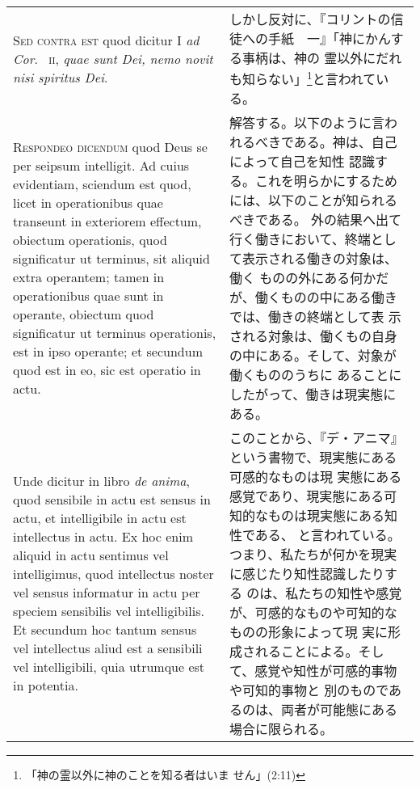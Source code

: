\documentclass[10pt]{jsarticle} %
\begin{document}
\begin{longtable}{p{21em}p{21em}}
\\


{\scshape Sed contra est} quod dicitur I {\itshape ad Cor}.~{\scshape
ii}, {\itshape quae sunt Dei, nemo novit nisi spiritus Dei}.

&

しかし反対に、『コリントの信徒への手紙　一』「神にかんする事柄は、神の
霊以外にだれも知らない」\footnote{「神の霊以外に神のことを知る者はいま
せん」(2:11)}と言われている。

\\

{\scshape Respondeo dicendum} quod Deus se per seipsum intelligit. Ad
cuius evidentiam, sciendum est quod, licet in operationibus quae
transeunt in exteriorem effectum, obiectum operationis, quod
significatur ut terminus, sit aliquid extra operantem; tamen in
operationibus quae sunt in operante, obiectum quod significatur ut
terminus operationis, est in ipso operante; et secundum quod est in
eo, sic est operatio in actu.

&

解答する。以下のように言われるべきである。神は、自己によって自己を知性
認識する。これを明らかにするためには、以下のことが知られるべきである。
外の結果へ出て行く働きにおいて、終端として表示される働きの対象は、働く
ものの外にある何かだが、働くものの中にある働きでは、働きの終端として表
示される対象は、働くもの自身の中にある。そして、対象が働くもののうちに
あることにしたがって、働きは現実態にある。


\\


Unde dicitur in libro {\itshape de anima}, quod sensibile in actu est
sensus in actu, et intelligibile in actu est intellectus in actu. Ex
hoc enim aliquid in actu sentimus vel intelligimus, quod intellectus
noster vel sensus informatur in actu per speciem sensibilis vel
intelligibilis. Et secundum hoc tantum sensus vel intellectus aliud
est a sensibili vel intelligibili, quia utrumque est in potentia.

&

このことから、『デ・アニマ』という書物で、現実態にある可感的なものは現
実態にある感覚であり、現実態にある可知的なものは現実態にある知性である、
と言われている。つまり、私たちが何かを現実に感じたり知性認識したりする
のは、私たちの知性や感覚が、可感的なものや可知的なものの形象によって現
実に形成されることによる。そして、感覚や知性が可感的事物や可知的事物と
別のものであるのは、両者が可能態にある場合に限られる。

\\



\end{longtable}
\end{document}

